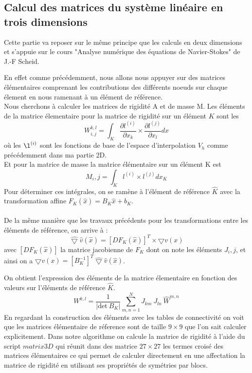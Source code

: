 \documentclass[a4paper,12pt,titlepage]{report}
\begin{document}
\begin{onehalfspace}
\newpage
\subsection{Calcul des matrices du système linéaire en trois dimensions}

Cette partie va reposer sur le même principe que les calculs en deux dimensions et s'appuie sur le cours "Analyse numérique des équations de
Navier-Stokes" de J.-F Scheid.

En effet comme précédemment, nous allons nous appuyer sur des matrices élémentaires comprenant les contributions des différents noeuds sur chaque élement en nous ramenant à un élément de référence.  \\
Nous cherchons à calculer les matrices de rigidité A et de masse M.
Les éléments de la matrice élementaire pour la matrice de rigidité sur un élément $K$ sont les 
\[
W_{i,j}^{k,l}=\int_K \frac{\partial l^{(i)}}{\partial x_k} \times \frac{\partial l^{(j)}}{\partial x_l}dx
\]
où les  $\l^{(i)}$ sont les fonctions de base de l'espace d'interpolation $V_h$ comme précédemment dans ma partie 2D. \\
Et pour la matrice de masse la matrice élémentaire sur un élément K est
\[
M_i,j=\int_K l^{(i)}\times l^{(j)}dx
_K 
\]
 Pour déterminer ces intégrales, on se ramène à l'élément de référence $\hat{K}$ avec la transformation affine
$F_K(\hat{x})=B_K \hat{x} + b_K$.
\\
\\
De la même manière que les travaux précédents pour les transformations entre les éléments de référence, on arrive à :
\[
\hat{\bigtriangledown}\hat{v}(\hat{x})= [DF_K(\hat{x})]^T\times \bigtriangledown v(x)
\]
avec $[DF_K(\hat{x})]$ la matrice jacobienne de $F_K$ dont on note les éléments $J_i,j$, et ainsi on a $\bigtriangledown v(x) = [B_K^{-1}]^T\hat{\bigtriangledown} \hat{v}(\hat{x})$.

On obtient l'expression des éléments de la matrice élementaire en fonction des valeurs sur l'éléments de référence $\hat{K}$.
\[
W^{k,l} = \frac{1}{|\text{det} \ B_K|}\sum_{m,n=1}^{N} J_{km}\ J_{ln}\ \hat{W}^{m,n}
\]
En regardant la construction des éléments avec les tables de connectivité on voit que les matrices élémentaire de réference sont de taille $9\times 9$ que l'on sait calculer explicitement.
Dans notre algorithme on calcule la matrice de rigidité à l'aide du script $matrix3D$ qui réunit dans des matrice $27\times 27$ les termes croisé des matrices élémentaires ce qui permet de calculer directement en une affectation la matrice de rigidité en utilisant ses propriétés de symétries par blocs.


\end{onehalfspace}
\end{document}
